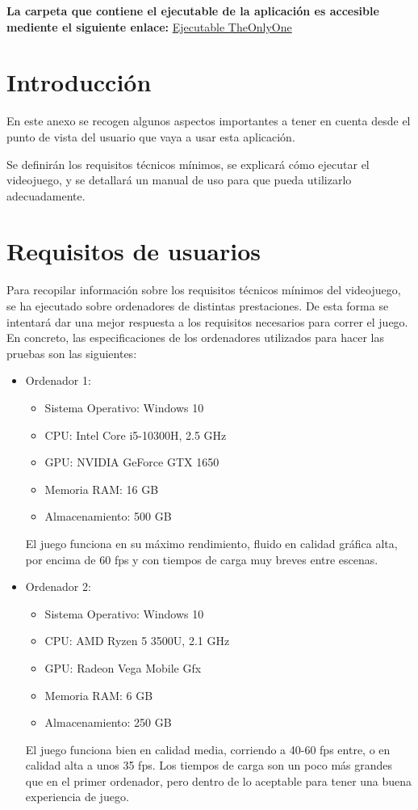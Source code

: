 \textbf{La carpeta que contiene el ejecutable de la aplicación es accesible mediente el siguiente enlace: }
\href{https://universidaddeburgos-my.sharepoint.com/:f:/g/personal/afr1004\_alu\_ubu\_es/Ei\_2b5muAPNGocDZ6OlOePkBiSd7YS9sqEIEs4rnnWH6Og?e=dhFtGp}{Ejecutable TheOnlyOne}
\section{Introducción}
En este anexo se recogen algunos aspectos importantes a tener en cuenta desde el punto de vista del usuario que vaya a usar esta aplicación.

Se definirán los requisitos técnicos mínimos, se explicará cómo ejecutar el videojuego, y se detallará un manual de uso para que pueda utilizarlo adecuadamente.
\section{Requisitos de usuarios}
Para recopilar información sobre los requisitos técnicos mínimos del videojuego, se ha ejecutado sobre ordenadores de distintas prestaciones. De esta forma se intentará dar una mejor respuesta a los requisitos necesarios para correr el juego.
En concreto, las especificaciones de los ordenadores utilizados para hacer las pruebas son las siguientes:
\begin{itemize}
    \item Ordenador 1:
        \begin{itemize}
        \item Sistema Operativo: Windows 10
        \item CPU: Intel Core i5-10300H, 2.5 GHz
        \item GPU: NVIDIA GeForce GTX 1650 
        \item Memoria RAM: 16 GB
        \item Almacenamiento: 500 GB
        \end{itemize}
    El juego funciona en su máximo rendimiento, fluido en calidad gráfica alta, por encima de 60 fps y con tiempos de carga muy breves entre escenas.
    \item Ordenador 2:
        \begin{itemize}
        \item Sistema Operativo: Windows 10
        \item CPU: AMD Ryzen 5 3500U, 2.1 GHz
        \item GPU: Radeon Vega Mobile Gfx
        \item Memoria RAM: 6 GB
        \item Almacenamiento: 250 GB
        \end{itemize}
    El juego funciona bien en calidad media, corriendo a 40-60 fps entre, o en calidad alta a unos 35 fps. Los tiempos de carga son un poco más grandes que en el primer ordenador, pero dentro de lo aceptable para tener una buena experiencia de juego.
\end{itemize}
